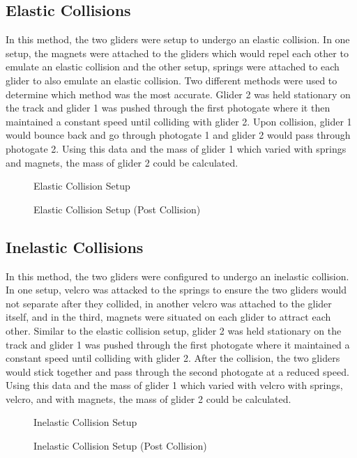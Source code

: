 \documentclass[12pt]{article}
\begin{document}
\subsection{Elastic Collisions}
In this method, the two gliders were setup to undergo an elastic collision. In one setup, the magnets were attached to the gliders which would repel each other to emulate an elastic collision and the other setup, springs were attached to each glider to also emulate an elastic collision. Two different methods were used to determine which method was the most accurate. Glider 2 was held stationary on the track and glider 1 was pushed through the first photogate where it then maintained a constant speed until colliding with glider 2. Upon collision, glider 1 would bounce back and go through photogate 1 and glider 2 would pass through photogate 2. Using this data and the mass of glider 1 which varied with springs and magnets, the mass of glider 2 could be calculated.
\begin{subfigures}
	\begin{figure}[H]
		\centering
		
		\caption{Elastic Collision Setup}
	\end{figure}
	\begin{figure}[H]
		\centering
		
		\caption{Elastic Collision Setup (Post Collision)}
	\end{figure}
\end{subfigures}
\subsection{Inelastic Collisions}
In this method, the two gliders were configured to undergo an inelastic collision. In one setup, velcro was attacked to the springs to ensure the two gliders would not separate after they collided, in another velcro was attached to the glider itself, and in the third, magnets were situated on each glider to attract each other. Similar to the elastic collision setup, glider 2 was held stationary on the track and glider 1 was pushed through the first photogate where it maintained a constant speed until colliding with glider 2. After the collision, the two gliders would stick together and pass through the second photogate at a reduced speed. Using this data and the mass of glider 1 which varied with velcro with springs, velcro, and with magnets, the mass of glider 2 could be calculated.
\begin{subfigures}
	\begin{figure}[H]
		\centering
		\caption{Inelastic Collision Setup}
	\end{figure}
	\begin{figure}[H]
		\centering
		    
		\caption{Inelastic Collision Setup (Post Collision)}
	\end{figure}
\end{subfigures}
\end{document}
